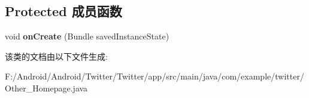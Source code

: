 \subsection*{Protected 成员函数}
\begin{DoxyCompactItemize}
\item 
\mbox{\label{classcom_1_1example_1_1twitter_1_1_other___homepage_a0426634d9720783468fdc13f49ec6c98}} 
void {\bfseries on\+Create} (Bundle saved\+Instance\+State)
\end{DoxyCompactItemize}


该类的文档由以下文件生成\+:\begin{DoxyCompactItemize}
\item 
F\+:/\+Android/\+Android/\+Twitter/\+Twitter/app/src/main/java/com/example/twitter/Other\+\_\+\+Homepage.\+java\end{DoxyCompactItemize}
